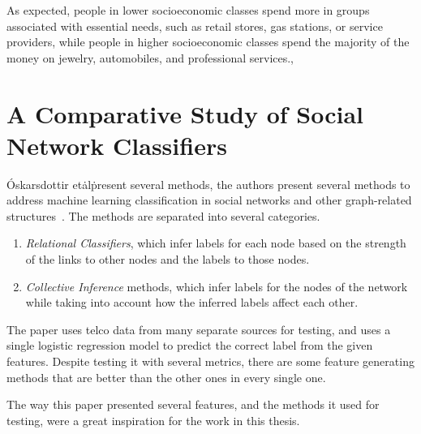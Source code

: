 As expected, people in lower socioeconomic classes spend more in groups associated with essential needs, such as retail stores, gas stations, or service providers, while people in higher socioeconomic classes spend the majority of the money on jewelry, automobiles, and professional services.,

\section{A Comparative Study of Social Network Classifiers}

Óskarsdottir et\. al\. present several methods, the authors present several methods to address machine learning classification in social networks and other graph-related structures~\cite{oskarsdottir2016}.
The methods are separated into several categories.

\begin{enumerate}
	\item \emph{Relational Classifiers}, which infer labels for each node based on the strength of the links to other nodes and the labels to those nodes.
	\item \emph{Collective Inference} methods, which infer labels for the nodes of the network while taking into account how the inferred labels affect each other.
\end{enumerate}

The paper uses telco data from many separate sources for testing, and uses a single logistic regression model to predict the correct label from the given features.
Despite testing it with several metrics, there are some feature generating methods that are better than the other ones in every single one.

The way this paper presented several features, and the methods it used for testing, were a great inspiration for the work in this thesis.
